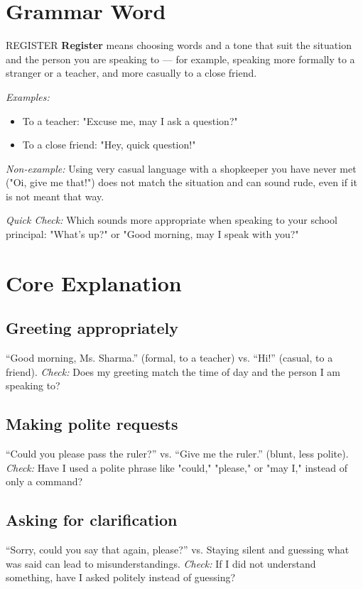 \section{Grammar Word}
\begin{grammarword}{REGISTER}
\textbf{Register} means choosing words and a tone that suit the situation and the person you are speaking to — for example, speaking more formally to a stranger or a teacher, and more casually to a close friend.

\textit{Examples:}
\begin{itemize}
    \item To a teacher: "Excuse me, may I ask a question?"
    \item To a close friend: "Hey, quick question!"
\end{itemize}

\textit{Non-example:} Using very casual language with a shopkeeper you have never met ("Oi, give me that!") does not match the situation and can sound rude, even if it is not meant that way.

\textit{Quick Check:} Which sounds more appropriate when speaking to your school principal: "What's up?" or "Good morning, may I speak with you?"
\end{grammarword}

\section{Core Explanation}

\subsection*{Greeting appropriately}
``Good morning, Ms. Sharma.'' (formal, to a teacher) vs. ``Hi!'' (casual, to a friend). \textit{Check:} Does my greeting match the time of day and the person I am speaking to?

\subsection*{Making polite requests}
``Could you please pass the ruler?'' vs. ``Give me the ruler.'' (blunt, less polite). \textit{Check:} Have I used a polite phrase like "could," "please," or "may I," instead of only a command?

\subsection*{Asking for clarification}
``Sorry, could you say that again, please?'' vs. Staying silent and guessing what was said can lead to misunderstandings. \textit{Check:} If I did not understand something, have I asked politely instead of guessing?

